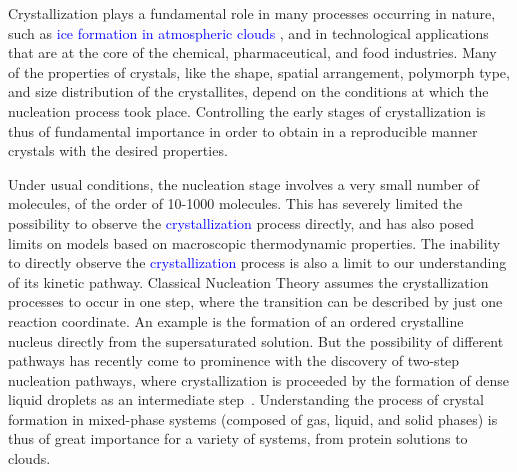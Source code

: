 \documentclass[preprint,amsmath,amssymb,superscriptaddress]{revtex4-1}
\begin{document}
\maketitle


Crystallization plays a fundamental role in many processes occurring in nature, such as \textcolor{blue}{ice formation in atmospheric clouds \cite{glickman2000glossary,morrison2012resilience}}, and in technological applications
that are at the core of the chemical, pharmaceutical, and food industries.
Many of the properties of crystals, like the shape, spatial arrangement, polymorph type, and size distribution of the crystallites, depend on the conditions at which
the nucleation process took place. Controlling the early stages of crystallization is thus of fundamental importance in order to
obtain in a reproducible manner crystals with the desired properties. 

Under usual conditions, the nucleation stage involves a very small number of molecules, of the order of 10-1000 molecules.
This has severely limited the possibility to observe the  \textcolor{blue}{crystallization} process directly, and has also posed limits on models based on macroscopic thermodynamic properties. 
The inability to directly observe the  \textcolor{blue}{crystallization} process is also a limit to our understanding of its kinetic pathway. 
Classical Nucleation Theory assumes the crystallization processes to occur in one step,
where the transition can be described by just one reaction coordinate. An example is the formation of an ordered crystalline nucleus
directly from the supersaturated solution. But the possibility of different pathways has recently come to prominence with
the discovery of two-step nucleation pathways, where crystallization is proceeded by the formation of dense liquid  droplets as an intermediate step~\cite{ten1997enhancement,SearR,savage2009experimental,vekilov2010two,palberg2014crystallization}.
Understanding the process of crystal formation in mixed-phase systems (composed of gas, liquid, and solid phases) is thus
of great importance for a variety of systems, from protein solutions to clouds. 
\end{document}
